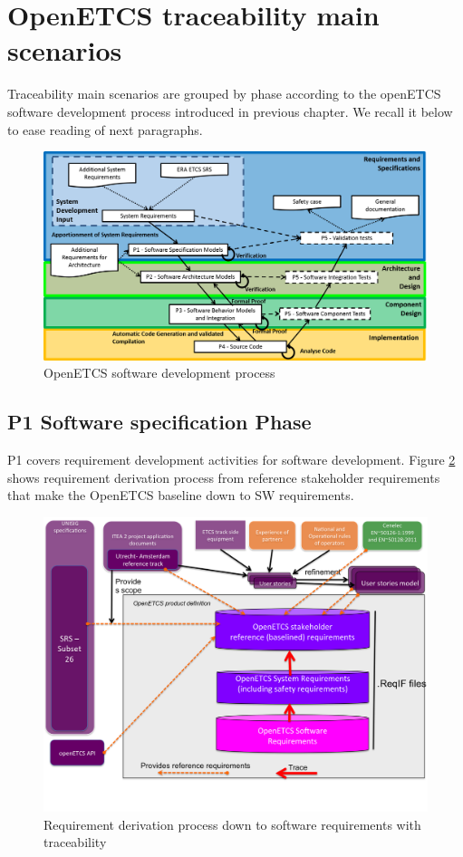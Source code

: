 \documentclass[11pt]{template/openetcs_report}
\begin{document}
\section{OpenETCS traceability main scenarios}
Traceability main scenarios are grouped by phase according to the openETCS software development process introduced in previous chapter. We recall it below to ease reading of next paragraphs.

\begin{figure} [htbp]
\centering
\includegraphics[width=.9\linewidth]
{./images/OpenETCSDevelopmentProcess.png}
\caption{\label{fig:OpenETCSDevelopmentProcess}OpenETCS software development process}
\end{figure} 

\subsection{P1 Software specification Phase}

P1 covers requirement development activities for software development.
Figure \ref{fig:P1RequirementDerivation} shows requirement derivation process from reference stakeholder requirements that make the OpenETCS baseline down to SW requirements.


\begin{figure}[htbp]
\centering
\includegraphics[width=.9\linewidth]
{./images/P1RequirementDerivation.png}
\caption{\label{fig:P1RequirementDerivation}Requirement derivation process down to software requirements with traceability}
\end{figure}
\end{document}
